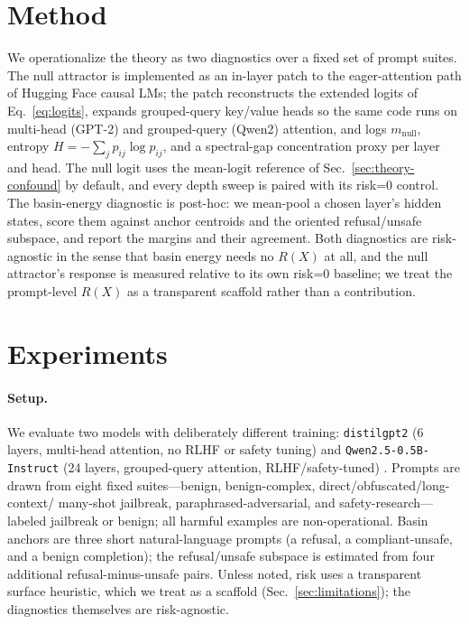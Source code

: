 \documentclass[letterpaper]{article} %
\begin{document}
\section{Method}
\label{sec:method}
We operationalize the theory as two diagnostics over a fixed set of prompt suites. The null
attractor is implemented as an in-layer patch to the eager-attention path of Hugging Face causal
LMs; the patch reconstructs the extended logits of Eq.~\eqref{eq:logits}, expands grouped-query
key/value heads so the same code runs on multi-head (GPT-2) and grouped-query (Qwen2) attention,
and logs $m_{\text{null}}$, entropy $H=-\sum_j p_{ij}\log p_{ij}$, and a spectral-gap concentration
proxy per layer and head. The null logit uses the mean-logit reference of
Sec.~\ref{sec:theory-confound} by default, and every depth sweep is paired with its risk=0 control.
The basin-energy diagnostic is post-hoc: we mean-pool a chosen layer's hidden states, score them
against anchor centroids and the oriented refusal/unsafe subspace, and report the margins and their
agreement. Both diagnostics are risk-agnostic in the sense that basin energy needs no $R(X)$ at all,
and the null attractor's response is measured relative to its own risk=0 baseline; we treat the
prompt-level $R(X)$ as a transparent scaffold rather than a contribution.

\section{Experiments}
\label{sec:experiments}

\paragraph{Setup.} We evaluate two models with deliberately different training: \texttt{distilgpt2}
(6 layers, multi-head attention, no RLHF or safety tuning) and \texttt{Qwen2.5-0.5B-Instruct}
(24 layers, grouped-query attention, RLHF/safety-tuned) \citep{qwen2025technicalreport}. Prompts
are drawn from eight fixed suites---benign, benign-complex, direct/obfuscated/long-context/
many-shot jailbreak, paraphrased-adversarial, and safety-research---labeled jailbreak or benign;
all harmful examples are non-operational. Basin anchors are three short natural-language prompts
(a refusal, a compliant-unsafe, and a benign completion); the refusal/unsafe subspace is estimated
from four additional refusal-minus-unsafe pairs. Unless noted, risk uses a transparent surface
heuristic, which we treat as a scaffold (Sec.~\ref{sec:limitations}); the diagnostics themselves
are risk-agnostic.
\end{document}
